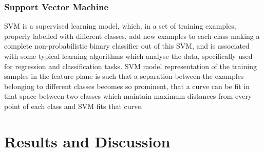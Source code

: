 \documentclass{llncs}
\begin{document}
\subsubsection{Support Vector Machine}
SVM \cite{zhang2012support} is a supervised learning model, which, in a set of training examples, properly labelled with different classes, add new examples to each class making a complete non-probabilistic binary classifier out of this SVM, and is associated with some typical learning algorithms which analyse the data, specifically used for regression and classification tasks. SVM model representation of the training samples in the feature plane is such that a separation between the examples belonging to different classes becomes so prominent, that a curve can be fit in that space between two classes which maintain maximum distances from every point of each class and SVM fits that curve. \section{Results and Discussion}\label{results}
\end{document}

